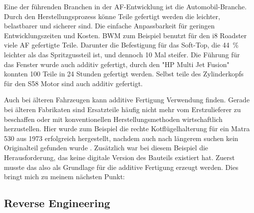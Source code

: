 \documentclass[../main.tex]{subfiles}
\begin{document}
Eine der führenden Branchen in der AF-Entwicklung ist die Automobil-Branche. 
Durch den Herstellungsprozess
könne Teile gefertigt werden die leichter, belastbarer und sicherer sind. Die 
einfache Anpassbarkeit für geringen Entwicklungszeiten und Kosten. 
BWM zum Beispiel benutzt für den i8 Roadster viele AF gefertigte Teile.
Darunter die Befestigung für das Soft-Top, die 44 \% leichter als das Spritzgussteil
ist, und dennoch 10 Mal steifer. \cite{Vafadar.2021} 
Die Führung für das Fenster wurde auch additiv gefertigt, durch den "HP Multi Jet Fusion" 
konnten 100 Teile in 24 Stunden gefertigt werden. Selbst teile des Zylinderkopfs für den 
S58 Motor sind auch additiv gefertigt. \cite{Anusci.2019}

Auch bei älteren Fahrzeugen kann additive Fertigung Verwendung finden.
Gerade bei älteren Fabrikaten sind Ersatzteile häufig nicht mehr vom 
Erstzulieferer zu beschaffen oder mit konventionellen Herstellungsmethoden
wirtschaftlich herzustellen.
Hier wurde zum Beispiel die rechte 
Kotflügelhalterung für ein Matra 530 aus 1973 erfolgreich hergestellt, nachdem auch nach längerem suchen
kein Originalteil gefunden wurde \cite{AMExpo365.03.06.2024}. Zusätzlich war
bei diesem Beispiel die Herausforderung, das keine digitale Version des
Bauteils existiert hat. Zuerst musste das also als Grundlage für die
additive Fertigung erzeugt werden. Dies bringt mich zu meinem nächsten Punkt:

\subsection{Reverse Engineering}
\end{document}
